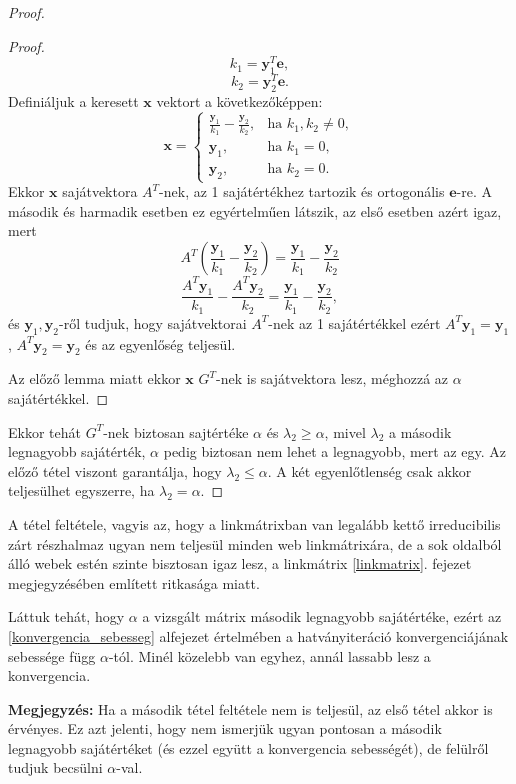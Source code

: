 \documentclass[12pt,a4paper]{article}
\newcommand{\bx}{\mathbf{x}}
\newcommand{\be}{\mathbf{e}}
\newcommand{\by}{\mathbf{y}}
\begin{document}
\begin{proof}
\begin{proof}
		\[ k_1 = \by_1^T \be, \]
		\[ k_2 = \by_2^T \be. \]
		Definiáljuk a keresett $\bx$ vektort a következőképpen:
		\begin{equation*}
		\bx=\begin{cases}
		\frac{\by_1}{k_1} - \frac{\by_2}{k_2}, & \text{ha $k_1,k_2 \neq 0$},\\
		\by_1, & \text{ha $k_1 = 0$}, \\
		\by_2, & \text{ha $k_2 = 0$}. 
		\end{cases}
		\end{equation*}
		\noindent
		Ekkor $\bx$ sajátvektora $A^T$-nek, az 1 sajátértékhez tartozik és ortogonális $\be$-re. A második és harmadik esetben ez egyértelműen látszik, az első esetben azért igaz, mert 
		\[ A^T (\frac{\by_1}{k_1} - \frac{\by_2}{k_2}) = \frac{\by_1}{k_1} - \frac{\by_2}{k_2} \] 
		\[ \frac{A^T \by_1}{k_1} - \frac{A^T \by_2}{k_2} = \frac{\by_1}{k_1} - \frac{\by_2}{k_2}, \]
		és $\by_1,\by_2$-ről tudjuk, hogy sajátvektorai $A^T$-nek az 1 sajátértékkel ezért $A^T \by_1 = \by_1$, $A^T \by_2 = \by_2$ és az egyenlőség teljesül. 
		
		Az előző lemma miatt ekkor $\bx$ $G^T$-nek is sajátvektora lesz, méghozzá az $\alpha$ sajátértékkel.  
	\end{proof} 

	Ekkor tehát $G^T$-nek biztosan sajtértéke $\alpha$ és $\lambda_2 \geq \alpha$, mivel $\lambda_2$ a második legnagyobb sajátérték, $\alpha$ pedig biztosan nem lehet a legnagyobb, mert az egy. Az előző tétel viszont garantálja, hogy $\lambda_2 \leq \alpha$. A két egyenlőtlenség csak akkor teljesülhet egyszerre, ha $\lambda_2 = \alpha$.
\end{proof}
\vspace{0.2cm}

A tétel feltétele, vagyis az, hogy a linkmátrixban van legalább kettő irreducibilis zárt részhalmaz ugyan nem teljesül minden web linkmátrixára, de a sok oldalból álló webek estén szinte bisztosan igaz lesz, a linkmátrix \ref{linkmatrix}. fejezet megjegyzésében említett ritkasága miatt.

Láttuk tehát, hogy $\alpha$ a vizsgált mátrix második legnagyobb sajátértéke, ezért az \ref{konvergencia_sebesseg} alfejezet értelmében a hatványiteráció konvergenciájának sebessége függ $\alpha$-tól. Minél közelebb van egyhez, annál lassabb lesz a konvergencia.

\vspace{0.2cm}\textbf{Megjegyzés:} Ha a második tétel feltétele nem is teljesül, az első tétel akkor is érvényes. Ez azt jelenti, hogy nem ismerjük ugyan pontosan a második legnagyobb sajátértéket (és ezzel együtt a konvergencia sebességét), de felülről tudjuk becsülni $\alpha$-val.
\end{document}
